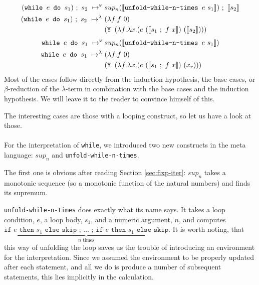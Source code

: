 \documentclass[11pt, leqno, titlepage]{article}
\theoremstyle{definition}
\begin{document}
\begin{align}
  (\texttt{while } e \texttt{ do } s_1) ~;~ s_2
  ~\mapsto^{\texttt{w}}~ & sup_n(\llbracket \texttt{unfold-while-n-times }e~s_1
                \rrbracket) ~;~\llbracket s_2\rrbracket \label{eq:while-sec-both}\\
  (\texttt{while } e \texttt{ do } s_1) ~;~ s_2
  ~\mapsto^\lambda~ & (\lambda f. f~0)\notag\\
                         &(\texttt{Y }(\lambda f.\lambda x.(e~(\llbracket
                           s_1~;~f~x\rrbracket) ~(\llbracket s_2\rrbracket )))\notag
\end{align}
\begin{align}
  \texttt{while } e \texttt{ do } s_1
  ~\mapsto^{\texttt{w}}~ & sup_n(\llbracket \texttt{unfold-while-n-times }e~s_1
                           \rrbracket)\label{eq:while-both} \\
  \texttt{while } e \texttt{ do } s_1
  ~\mapsto^\lambda~ & (\lambda f. f~0)\notag\\
                         &(\texttt{Y }(\lambda f.\lambda x.(e~(\llbracket
                           s_1~;~f~x\rrbracket) ~(x_r)))\notag
\end{align}
Most of the cases follow directly from the induction hypothesis, the base cases, or
$\beta$-reduction of the $\lambda$-term in combination with the base cases and the
induction hypothesis. We will leave it to the reader to convince himself of this.

The interesting cases are those with a looping construct, so let us have a look at
those.\\
\\
For the interpretation of \texttt{while}, we introduced two new constructs in the
meta language: $sup_n$ and \texttt{unfold-while-n-times}.

The first one is obvious after reading Section \ref{sec:fixp-iter}: $sup_n$ takes a
monotonic sequence (so a monotonic function of the natural numbers) and finds its
supremum.

\texttt{unfold-while-n-times} does exactly what its name says. It takes a loop
condition, $e$, a loop body, $s_1$, and a numeric argument, $n$, and computes
$\underbrace{\texttt{if $e$ then $s_1$ else skip ; $\dots$ ; if $e$ then $s_1$ else
    skip}}_{n\text{ times}}$. It is worth noting, that this way of unfolding the loop
saves us the trouble of introducing an environment for the interpretation. Since we
assumed the environment to be properly updated after each statement, and all we do is
produce a number of subsequent statements, this lies implicitly in the calculation. 
\end{document}
